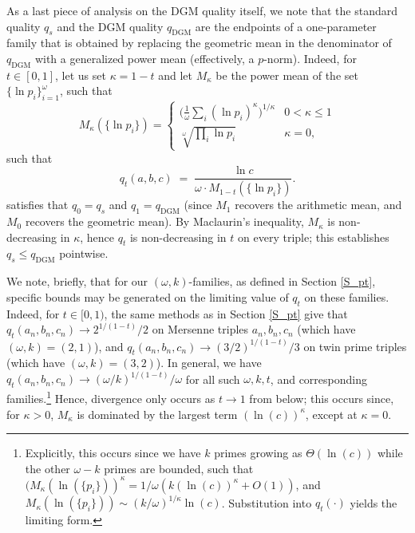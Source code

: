 \documentclass[11pt,letterpaper]{amsart}
\def\ra{\rightarrow}
\begin{document}
As a last piece of analysis on the DGM quality itself, we note that the standard quality $q_s$ and the DGM quality $q_{\mathrm{DGM}}$ are the endpoints of a one-parameter family that is obtained by replacing the geometric mean in the denominator of $q_{\mathrm{DGM}}$ with a generalized power mean (effectively, a $p$-norm). Indeed, for $t\in[0,1]$, let us set $\kappa =1-t$ and let $M_{\kappa}$ be the power mean of the set $\{\ln p_i\}_{i=1}^\omega$, such that
\[
M_{\kappa}(\{\ln p_i\}) = \begin{cases}\bigl(\tfrac{1}{\omega}\sum_i(\ln p_i)^{\kappa} \bigr)^{1/\kappa} & 0<\kappa \le 1\\[2pt] \sqrt[\omega]{\prod_i\ln p_i} & \kappa =0,\end{cases}
\]
such that
\[
q_t(a,b,c) \;=\; \frac{\ln c}{\omega\cdot M_{1-t}(\{\ln p_i\})}.
\]
satisfies that $q_0 = q_s$ and $q_1 = q_{\mathrm{DGM}}$ (since $M_1$ recovers the arithmetic mean, and $M_0$ recovers the geometric mean). By Maclaurin's inequality, $M_{\kappa}$ is non-decreasing in ${\kappa}$, hence $q_t$ is non-decreasing in $t$ on every triple; this establishes $q_s\le q_{\mathrm{DGM}}$ pointwise.

We note, briefly, that for our $(\omega,k)$-families, as defined in Section \ref{S_pt}, specific bounds may be generated on the limiting value of $q_t$ on these families. Indeed, for $t \in [0, 1)$, the same methods as in Section \ref{S_pt} give that $q_t(a_n, b_n, c_n) \ra 2^{1/(1 - t)}/2$ on Mersenne triples $a_n, b_n, c_n$ (which have $(\omega, k) = (2, 1)$), and $q_t(a_n, b_n, c_n) \ra (3/2)^{1/(1 - t)}/3$ on twin prime triples (which have $(\omega, k) = (3, 2)$). In general, we have $q_t(a_n, b_n, c_n) \ra (\omega/k)^{1/(1 - t)}/\omega$ for all such $\omega, k, t$, and corresponding families.\footnote{Explicitly, this occurs since we have $k$ primes growing as $\Theta(\ln(c))$ while the other $\omega - k$ primes are bounded, such that $(M_{\kappa}(\ln(\{p_i\}))^{\kappa} = 1/\omega (k (\ln(c))^{\kappa} + O(1))$, and $M_{\kappa} (\ln(\{p_i\})) \sim (k/\omega)^{1/\kappa} \ln(c)$. Substitution into $q_t(\cdot)$ yields the limiting form.} Hence, divergence only occurs as $t \ra 1$ from below; this occurs since, for $\kappa > 0$, $M_{\kappa}$ is dominated by the largest term $(\ln(c))^{\kappa}$, except at $\kappa = 0$.
\end{document}
